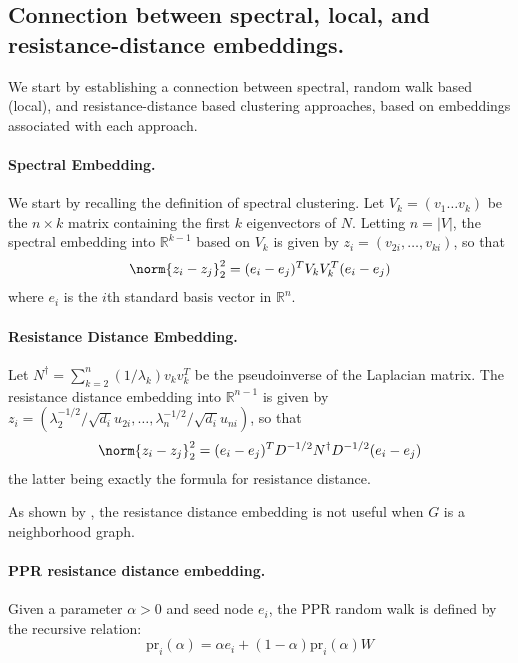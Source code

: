 \documentclass{article}
\newcommand{\Reals}{\mathbb{R}}
\newcommand{\abs}[1]{\left \lvert #1 \right \rvert}
\newcommand{\1}{\mathbb{I}}
\theoremstyle{alden}
\theoremstyle{aldenthm}
\theoremstyle{definition}
\theoremstyle{remark}
\begin{document}
\subsection{Connection between spectral, local, and resistance-distance embeddings.}

We start by establishing a connection between spectral, random walk based (local), and resistance-distance based clustering approaches, based on embeddings associated with each approach.

\paragraph{Spectral Embedding.}
We start by recalling the definition of spectral clustering. Let $V_k = (v_1 \ldots v_k)$ be the $n \times k$ matrix containing the first $k$ eigenvectors of $N$. Letting $n = \abs{V}$, the spectral embedding into $\Reals^{k - 1}$ based on $V_k$ is given by $z_i = (v_{2i}, \ldots, v_{ki})$, so that
\begin{equation*}
\norm{z_i - z_j}_2^2 = (e_i - e_j)^T V_k V_k^T (e_i - e_j)
\end{equation*}
where $e_i$ is the $i$th standard basis vector in $\Reals^n$.

\paragraph{Resistance Distance Embedding.}
Let $N^{\dagger} = \sum_{k = 2}^{n} (1/\lambda_k) v_k v_k^T$ be the pseudoinverse of the Laplacian matrix. The resistance distance embedding into $\Reals^{n - 1}$ is given by $z_i = (\lambda_{2}^{-1/2}/\sqrt{d_i} u_{2i}, \ldots, \lambda_{n}^{-1/2}/\sqrt{d_i} u_{ni})$, so that
\begin{equation*}
\norm{z_i - z_j}_2^2 = (e_i - e_j)^T D^{-1/2} N^{\dagger} D^{-1/2} (e_i - e_j)
\end{equation*}
the latter being exactly the formula for resistance distance.

As shown by \citep{vonluxburg14}, the resistance distance embedding is not useful when $G$ is a neighborhood graph. 

\paragraph{\textrm{PPR} resistance distance embedding.}

Given a parameter $\alpha > 0$ and seed node $e_i$, the \textrm{PPR} random walk is defined by the recursive relation:
\begin{equation*}
\textrm{pr}_{i}(\alpha) = \alpha e_i + (1 - \alpha) \textrm{pr}_{i}(\alpha) W
\end{equation*}
\end{document}

